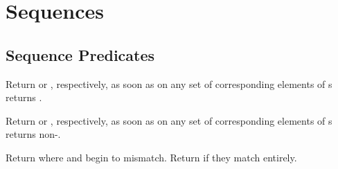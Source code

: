 %
%

\section{Sequences}
\label{section:Sequences}

\subsection{Sequence Predicates}
\begin{LIST}{1cm}

  {
  Return \retval{\NIL} or \retval{\T}, respectively, as soon as  on
  any set of corresponding elements of s returns \NIL.
  }

  {
  Return  or \retval{\NIL}, respectively, as soon
  as  on any set of corresponding elements of
  s returns non-\NIL.
  }

  {
  Return  where
   and  begin to
  mismatch. Return \retval{\NIL} if
  they match entirely.
  }

\end{LIST}

